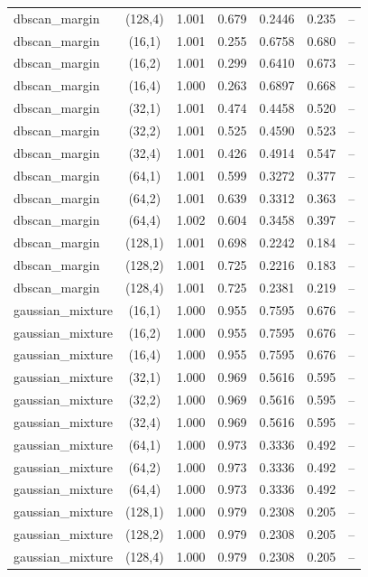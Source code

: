 \begin{tabular}{lcccccc}
dbscan\_margin & (128,4) & 1.001 & 0.679 & 0.2446 & 0.235 & -- \\
dbscan\_margin & (16,1) & 1.001 & 0.255 & 0.6758 & 0.680 & -- \\
dbscan\_margin & (16,2) & 1.001 & 0.299 & 0.6410 & 0.673 & -- \\
dbscan\_margin & (16,4) & 1.000 & 0.263 & 0.6897 & 0.668 & -- \\
dbscan\_margin & (32,1) & 1.001 & 0.474 & 0.4458 & 0.520 & -- \\
dbscan\_margin & (32,2) & 1.001 & 0.525 & 0.4590 & 0.523 & -- \\
dbscan\_margin & (32,4) & 1.001 & 0.426 & 0.4914 & 0.547 & -- \\
dbscan\_margin & (64,1) & 1.001 & 0.599 & 0.3272 & 0.377 & -- \\
dbscan\_margin & (64,2) & 1.001 & 0.639 & 0.3312 & 0.363 & -- \\
dbscan\_margin & (64,4) & 1.002 & 0.604 & 0.3458 & 0.397 & -- \\
dbscan\_margin & (128,1) & 1.001 & 0.698 & 0.2242 & 0.184 & -- \\
dbscan\_margin & (128,2) & 1.001 & 0.725 & 0.2216 & 0.183 & -- \\
dbscan\_margin & (128,4) & 1.001 & 0.725 & 0.2381 & 0.219 & -- \\
gaussian\_mixture & (16,1) & 1.000 & 0.955 & 0.7595 & 0.676 & -- \\
gaussian\_mixture & (16,2) & 1.000 & 0.955 & 0.7595 & 0.676 & -- \\
gaussian\_mixture & (16,4) & 1.000 & 0.955 & 0.7595 & 0.676 & -- \\
gaussian\_mixture & (32,1) & 1.000 & 0.969 & 0.5616 & 0.595 & -- \\
gaussian\_mixture & (32,2) & 1.000 & 0.969 & 0.5616 & 0.595 & -- \\
gaussian\_mixture & (32,4) & 1.000 & 0.969 & 0.5616 & 0.595 & -- \\
gaussian\_mixture & (64,1) & 1.000 & 0.973 & 0.3336 & 0.492 & -- \\
gaussian\_mixture & (64,2) & 1.000 & 0.973 & 0.3336 & 0.492 & -- \\
gaussian\_mixture & (64,4) & 1.000 & 0.973 & 0.3336 & 0.492 & -- \\
gaussian\_mixture & (128,1) & 1.000 & 0.979 & 0.2308 & 0.205 & -- \\
gaussian\_mixture & (128,2) & 1.000 & 0.979 & 0.2308 & 0.205 & -- \\
gaussian\_mixture & (128,4) & 1.000 & 0.979 & 0.2308 & 0.205 & -- \\

\end{tabular}
